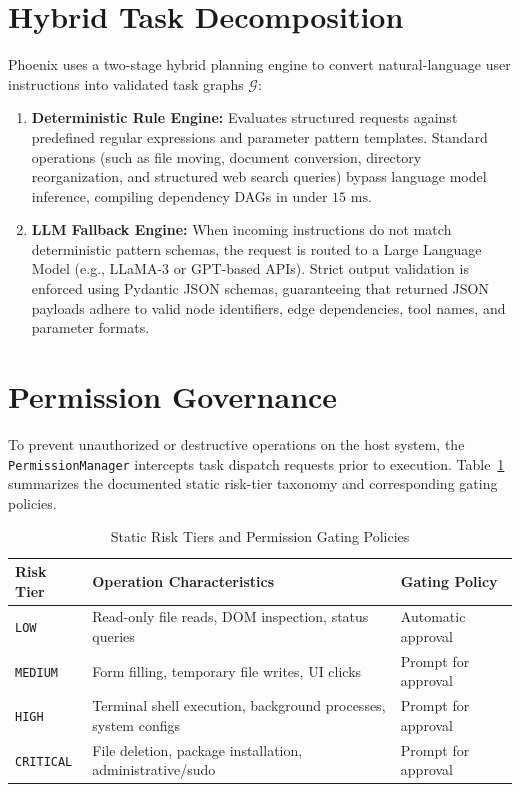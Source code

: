 \documentclass[conference]{IEEEtran}
\begin{document}
\section{Hybrid Task Decomposition}
\label{sec:decomposition}
Phoenix uses a two-stage hybrid planning engine to convert natural-language user instructions into validated task graphs $\mathcal{G}$:

\begin{enumerate}
    \item \textbf{Deterministic Rule Engine:} Evaluates structured requests against predefined regular expressions and parameter pattern templates. Standard operations (such as file moving, document conversion, directory reorganization, and structured web search queries) bypass language model inference, compiling dependency DAGs in under $15\text{ ms}$.
    \item \textbf{LLM Fallback Engine:} When incoming instructions do not match deterministic pattern schemas, the request is routed to a Large Language Model (e.g., LLaMA-3 or GPT-based APIs). Strict output validation is enforced using Pydantic JSON schemas, guaranteeing that returned JSON payloads adhere to valid node identifiers, edge dependencies, tool names, and parameter formats.
\end{enumerate}

\section{Permission Governance}
\label{sec:permissions}
To prevent unauthorized or destructive operations on the host system, the \texttt{PermissionManager} intercepts task dispatch requests prior to execution. Table~\ref{tab:permission_matrix} summarizes the documented static risk-tier taxonomy and corresponding gating policies.

\begin{table}[htbp]
\caption{Static Risk Tiers and Permission Gating Policies}
\label{tab:permission_matrix}
\centering
\begin{tabular}{p{1.5cm} p{3.8cm} p{2.2cm}}
\toprule
\textbf{Risk Tier} & \textbf{Operation Characteristics} & \textbf{Gating Policy} \\
\midrule
\texttt{LOW} & Read-only file reads, DOM inspection, status queries & Automatic approval \\
\midrule
\texttt{MEDIUM} & Form filling, temporary file writes, UI clicks & Prompt for approval \\
\midrule
\texttt{HIGH} & Terminal shell execution, background processes, system configs & Prompt for approval \\
\midrule
\texttt{CRITICAL} & File deletion, package installation, administrative/sudo & Prompt for approval \\
\bottomrule
\end{tabular}
\end{table}
\end{document}
